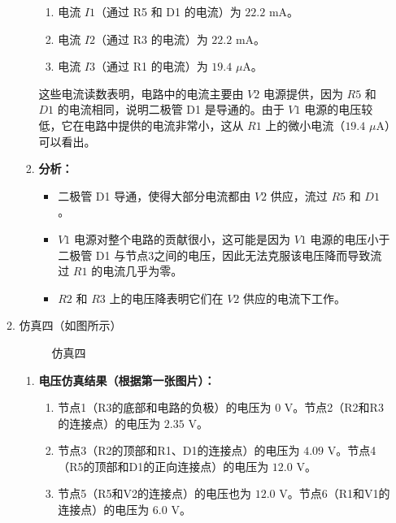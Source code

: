 \documentclass[dvipsnames, svgnames,a4paper,11pt]{article}
\begin{document}
\begin{enumerate}
\begin{enumerate}
\begin{enumerate}
				\begin{enumerate}
					\item 电流 $I1$（通过 R5 和 D1 的电流）为 $22.2$ mA。
					\item 电流 $I2$（通过 R3 的电流）为 $22.2$ mA。
					\item 电流 $I3$（通过 R1 的电流）为 $19.4$ $\mu$A。
				\end{enumerate}
				
				这些电流读数表明，电路中的电流主要由 $V2$ 电源提供，因为 $R5$ 和 $D1$ 的电流相同，说明二极管 D1 是导通的。由于 $V1$ 电源的电压较低，它在电路中提供的电流非常小，这从 $R1$ 上的微小电流（$19.4$ $\mu$A）可以看出。
				
				\item \textbf{分析：}
				\begin{itemize}
					\item 二极管 D1 导通，使得大部分电流都由 $V2$ 供应，流过 $R5$ 和 $D1$。
					\item $V1$ 电源对整个电路的贡献很小，这可能是因为 $V1$ 电源的电压小于二极管 D1 与节点3之间的电压，因此无法克服该电压降而导致流过 $R1$ 的电流几乎为零。
					\item $R2$ 和 $R3$ 上的电压降表明它们在 $V2$ 供应的电流下工作。
				\end{itemize}
			\end{enumerate}
			
			\item 仿真四（如图所示）
			
			\begin{figure}[htbp]
				\centering
				\caption{仿真四}
				\label{fig:fig4-2}			
			\end{figure}
			
			\begin{enumerate}
				\item \textbf{电压仿真结果（根据第一张图片）：}
				
				\begin{enumerate}
					\item 节点1（R3的底部和电路的负极）的电压为 $0$ V。节点2（R2和R3的连接点）的电压为 $2.35$ V。 
					\item 节点3（R2的顶部和R1、D1的连接点）的电压为 $4.09$ V。节点4（R5的顶部和D1的正向连接点）的电压为 $12.0$ V。 
					\item 节点5（R5和V2的连接点）的电压也为 $12.0$ V。节点6（R1和V1的连接点）的电压为 $6.0$ V。 
				\end{enumerate}
				

\end{enumerate}
\end{enumerate}
\end{enumerate}
\end{document}
